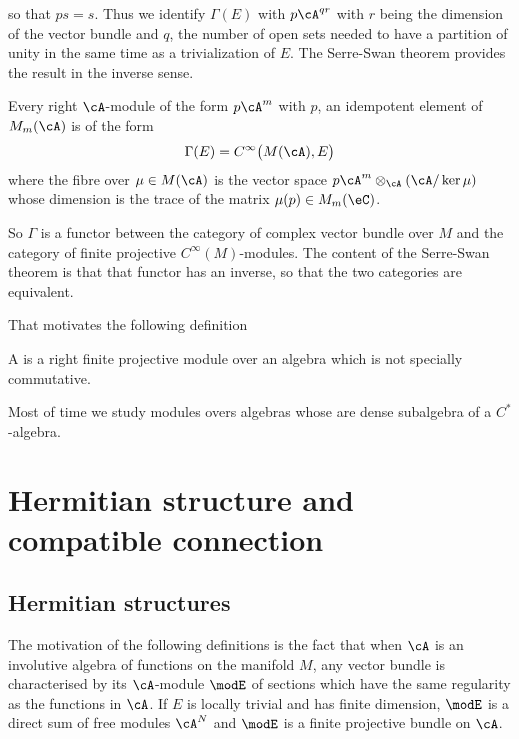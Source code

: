 so that $ps=s$. Thus we identify $\Gamma(E)$ with $p\cA^{qr}$ with $r$ being the dimension of the vector bundle and $q$, the number of open sets needed to have a partition of unity in the same time as a trivialization of $E$. The Serre-Swan theorem provides the result in the inverse sense.
\begin{theorem}
Every right $\cA$-module of the form $p\cA^m$ with $p$, an idempotent element of $M_m(\cA)$ is of the form
\[ 
  \Gamma(E)= C^{\infty}\big( M(\cA),E \big)
\]
where the fibre over $\mu\in M(\cA)$ is the vector space $p\cA^m\otimes_{\cA}(\cA/\ker\mu)$ whose dimension is the trace of the matrix $\mu(p)\in M_m(\eC)$.
\end{theorem}
So $\Gamma$ is a functor between the category of complex vector bundle over $M$ and the category of finite projective $C^{\infty}(M)$-modules. The content of the Serre-Swan theorem is that that functor has an inverse, so that the two categories are equivalent.

That motivates the following definition
\begin{definition}
A  is a right finite projective module over an algebra which is not specially commutative.
\end{definition}
Most of time we study modules overs algebras whose are dense subalgebra of a $C^*$-algebra.


\section{Hermitian structure and compatible connection}

\subsection{Hermitian structures}

The motivation of the following definitions is the fact that when $\cA$ is an involutive algebra of functions on the manifold $M$, any vector bundle is characterised by its  $\cA$-module $\modE$ of sections which have the same regularity as the functions in $\cA$. If $E$ is locally trivial and has finite dimension, $\modE$ is a direct sum of free modules $\cA^N$ and $\modE$ is a finite projective bundle on $\cA$.

